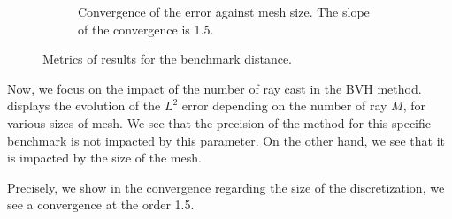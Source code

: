 \begin{figure}
\begin{subfigure}{0.49\textwidth}
    \caption{Convergence of the error against mesh size. The slope of the convergence is 1.5.}
    \label{fig:app:feelpp-distance:results:h}
  \end{subfigure}
  \caption{Metrics of results for the benchmark distance.}
  \label{fig:app:feelpp-distance:results}
\end{figure}

Now, we focus on the impact of the number of ray cast in the BVH method.
 displays the evolution of the $L^2$ error depending on the number of ray $M$, for various sizes of mesh.
We see that the precision of the method for this specific benchmark is not impacted by this parameter.
On the other hand, we see that it is impacted by the size of the mesh.

Precisely, we show in  the convergence regarding the size of the discretization, we see a convergence at the order 1.5.
